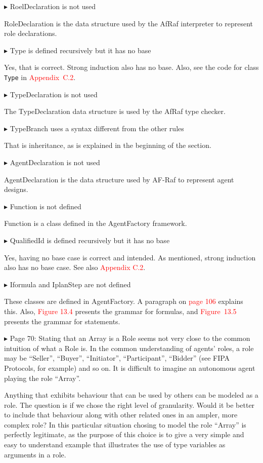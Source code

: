 \documentclass{article}
\newcommand*\R[1]{\textcolor{red}{#1}} %
\newenvironment{them}%
  {\bigskip\noindent\begingroup\color{blue}$\blacktriangleright$\enspace}%
  {\endgroup\par}
\begin{document}
\begin{them}
RoelDeclaration is not used 
\end{them}
RoleDeclaration is the data structure used by the AfRaf interpreter to
represent role declarations.

\begin{them}
Type is defined recursively but it has no base 
\end{them}
Yes, that is correct.
Strong induction also has no base.
Also, see the code for class {\tt Type} in \R{Appendix~C.2}.

\begin{them}
TypeDeclaration is not used 
\end{them}
The TypeDeclaration data structure is used by the AfRaf type checker.

\begin{them}
TypeBranch uses a syntax different from the other rules 
\end{them}
That is inheritance,
  as is explained in the beginning of the section.

\begin{them}
AgentDeclaration is not used 
\end{them}
AgentDeclaration is the data structure used by AF-Raf to represent
  agent designs.

\begin{them}
Function is not defined 
\end{them}
Function is a class defined in the AgentFactory framework.

\begin{them}
QualifiedId is defined recursively but it has no base
\end{them}
Yes, having no base case is correct and intended.
As mentioned, strong induction also has no base case.
See also \R{Appendix C.2}.


\begin{them}
Iformula and IplanStep are not defined
\end{them}
These classes are defined in AgentFactory. A paragraph on \R{page 106}  explains this.
Also, \R{Figure 13.4} presents the grammar for formulas, and \R{Figure~13.5}
presents the grammar for statements.

\begin{them}
Page 70:
Stating that an Array is a Role seems not very close to the common intuition of
what a Role is. In the common understanding of agents' roles, a role may be
``Seller'', ``Buyer'', ``Initiator'', ``Participant'', ``Bidder'' (see FIPA Protocols,
for example) and so on. It is difficult to imagine an autonomous agent playing
the role ``Array''.
\end{them}
Anything that exhibits behaviour that can be used by others can be modeled as a
role. The question is if we chose the right level of granularity. Would it be
better to include that behaviour along with other related ones in an ampler,
more complex role? In this particular situation chosing to model the role
``Array'' is perfectly legitimate, as the purpose of this choice is to give a
very simple and easy to understand example that illustrates the use of type
variables as arguments in a role.
\end{document}
